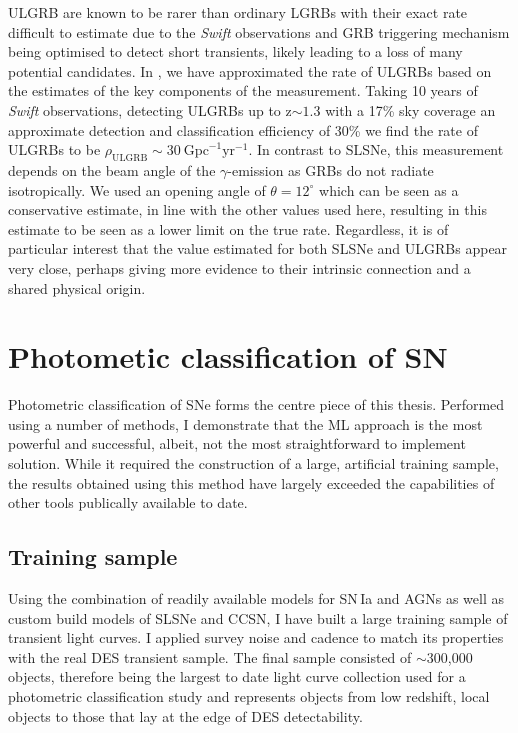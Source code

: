 ULGRB are known to be rarer than ordinary LGRBs with their exact rate difficult to estimate due to the \textit{Swift} observations and GRB triggering mechanism being optimised to detect short transients, likely leading to a loss of many potential candidates. In \citet{Prajs2016}, we have approximated the rate of ULGRBs based on the estimates of the key components of the measurement. Taking 10 years of \textit{Swift} observations, detecting ULGRBs up to z$\sim1.3$ with a 17\% sky coverage an approximate detection and classification efficiency of 30\% we find the rate of ULGRBs to be $\rho_{\mathrm{ULGRB}} \sim 30~\mathrm{Gpc}^{-1} \mathrm{yr}^{-1}$. In contrast to SLSNe, this measurement depends on the beam angle of the $\gamma$-emission as GRBs do not radiate isotropically. We used an opening angle of $\theta=12^\circ$ which can be seen as a conservative estimate, in line with the other values used here, resulting in this estimate to be seen as a lower limit on the true rate. Regardless, it is of particular interest that the value estimated for both SLSNe and ULGRBs appear very close, perhaps giving more evidence to their intrinsic connection and a shared physical origin.

\section{Photometic classification of SN}
Photometric classification of SNe forms the centre piece of this thesis. Performed using a number of methods, I demonstrate that the ML approach is the most powerful and successful, albeit, not the most straightforward to implement solution. While it required the construction of a large, artificial training sample, the results obtained using this method have largely exceeded the capabilities of other tools publically available to date.

\subsection{Training sample}
Using the combination of readily available models for SN\,Ia and AGNs as well as custom build models of SLSNe and CCSN, I have built a large training sample of transient light curves. I applied survey noise and cadence to match its properties with the real DES transient sample. The final sample consisted of $\sim$300,000 objects, therefore being the largest to date light curve collection used for a photometric classification study and represents objects from low redshift, local objects to those that lay at the edge of DES detectability.

